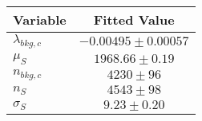 \begin{tabular}[t]{lc}
\hline
Variable &Fitted Value\\
\hline\hline
$\lambda_{bkg,c}$&$-0.00495\pm0.00057$\\
\hline
$\mu_{S}$&$1968.66\pm0.19$\\
\hline
$n_{bkg,c}$&$4230\pm96$\\
\hline
$n_{S}$&$4543\pm98$\\
\hline
$\sigma_{S}$&$9.23\pm0.20$\\
\hline
\end{tabular}